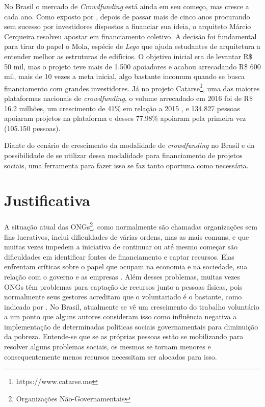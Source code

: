 No Brasil o mercado de \emph{Crowdfunding} está ainda em seu começo, mas cresce a cada ano. Como exposto por \citeauthor{globo-financiamento}, depois de passar mais de cinco anos procurando sem sucesso por investidores dispostos a financiar sua ideia, o arquiteto Márcio Cerqueira resolveu apostar em financiamento coletivo. A decisão foi fundamental para tirar do papel o Mola, espécie de \emph{Lego} que ajuda estudantes de arquitetura a entender melhor as estruturas de edifícios. O objetivo inicial era de levantar R\$ 50 mil, mas o projeto teve mais de 1.500 apoiadores e acabou arrecadando R\$ 600 mil, mais de 10 vezes a meta inicial, algo bastante incomum quando se busca financiamento com grandes investidores. Já no projeto Catarse\footnote{https://www.catarse.me}, uma das maiores plataformas nacionais de \emph{crowdfunding}, o volume arrecadado em 2016 foi de R\$ 16.2 milhões, um crescimento de 41\% em relação a 2015 \cite{catarse-retrospectiva2016}, e 134.827 pessoas apoiaram projetos na plataforma e desses 77.98\% apoiaram pela primeira vez (105.150 pessoas).

Diante do cenário de crescimento da modalidade de \emph{crowdfunding} no Brasil e da possibilidade de se utilizar dessa modalidade para financiamento de projetos sociais, uma ferramenta para fazer isso se faz tanto oportuna como necessária.



\section{Justificativa}



A situação atual das ONGs\footnote{Organizações Não-Governamentais}, como normalmente são chamadas organizações sem fins lucrativos, inclui dificuldades de várias ordens, mas as mais comuns, e que muitas vezes impedem a iniciativa de continuar ou até mesmo começar são dificuldades em identificar fontes de financiamento e captar recursos. Elas enfrentam críticas sobre o papel que ocupam na economia e na sociedade, sua relação com o governo e as empresas \cite{GOUVEIA2007}. Além desses problemas, muitas vezes ONGs têm problemas para captação de recursos junto a pessoas físicas, pois normalmente seus gestores acreditam que o voluntariado é o bastante, como indicado por \citeauthor{modeloGestaoONG}. No Brasil, atualmente se vê um crescimento do trabalho voluntário a um ponto que alguns autores \cite{fagundes2012repercussoes} consideram isso como influência negativa a implementação de determinadas politicas sociais governamentais para diminuição da pobreza. Entende-se que se as próprias pessoas estão se mobilizando para resolver alguns problemas sociais, os mesmos se tornam menores e consequentemente menos recursos necessitam ser alocados para isso.

